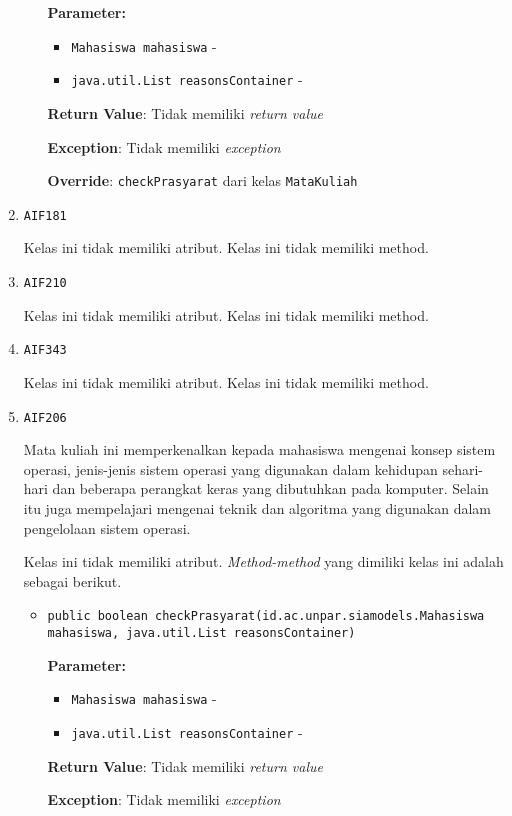 \documentclass{article}
\begin{document}
\begin{enumerate}
\begin{itemize}
\textbf{Parameter:}
\begin{itemize}
\item \texttt{Mahasiswa mahasiswa} - 
\item \texttt{java.util.List reasonsContainer} - 
\end{itemize}
\textbf{Return Value}: Tidak memiliki \textit{return value}

\textbf{Exception}: Tidak memiliki \textit{exception}

\textbf{Override}: \texttt{checkPrasyarat} dari kelas \texttt{MataKuliah}

\end{itemize}
\item \texttt{AIF181}



Kelas ini tidak memiliki atribut. Kelas ini tidak memiliki method. \item \texttt{AIF210}



Kelas ini tidak memiliki atribut. Kelas ini tidak memiliki method. \item \texttt{AIF343}



Kelas ini tidak memiliki atribut. Kelas ini tidak memiliki method. \item \texttt{AIF206}

Mata kuliah ini memperkenalkan kepada mahasiswa mengenai konsep sistem 
 operasi, jenis-jenis sistem operasi yang digunakan dalam kehidupan 
 sehari-hari dan beberapa perangkat keras yang dibutuhkan pada komputer. 
 Selain itu juga mempelajari mengenai teknik dan algoritma yang digunakan 
 dalam pengelolaan sistem operasi.

Kelas ini tidak memiliki atribut. \textit{Method-method} yang dimiliki kelas ini adalah sebagai berikut.
\begin{itemize}
\item \texttt{public boolean checkPrasyarat(id.ac.unpar.siamodels.Mahasiswa mahasiswa, java.util.List reasonsContainer)}

\textbf{Parameter:}
\begin{itemize}
\item \texttt{Mahasiswa mahasiswa} - 
\item \texttt{java.util.List reasonsContainer} - 
\end{itemize}
\textbf{Return Value}: Tidak memiliki \textit{return value}

\textbf{Exception}: Tidak memiliki \textit{exception}


\end{itemize}
\end{enumerate}
\end{document}
